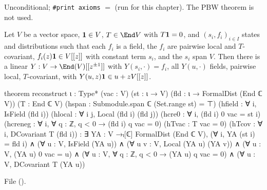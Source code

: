 \begin{status}
Unconditional; \texttt{\#print axioms}  $=$
\lean{[propext, Classical.}\allowbreak{}\allowbreak\lean{sound]} (run for this chapter). The PBW theorem  is not used.
\end{status}

\begin{theorem}\label{l03:thm:reconstruct}
Let $V$ be a vector space, $\mathbf{1}\in V$, $T\in\End V$ with $T\mathbf{1} = 0$, and $(s_i,f_i)_{i\in I}$
states and distributions such that each $f_i$ is a field, the $f_i$ are pairwise local and
$T$-covariant, $f_i(z)\mathbf{1}\in V[[z]]$ with constant term $s_i$, and the $s_i$ span $V$. Then there is
a linear $Y:V\to\End(V)[[z^{\pm1}]]$ with $Y(s_i,\cdot) = f_i$, all $Y(u,\cdot)$ fields, pairwise
local, $T$-covariant, with $Y(u,z)\mathbf{1}\in u+zV[[z]]$.
\end{theorem}
\begin{leancode}
theorem reconstruct {ι : Type*} (vac : V) (st : ι → V) (fld : ι → FormalDist (End ℂ V))
    (T : End ℂ V)
    (hspan : Submodule.span ℂ (Set.range st) = ⊤)
    (hfield : ∀ i, IsField (fld i))
    (hlocal : ∀ i j, Local (fld i) (fld j))
    (hcre0 : ∀ i, (fld i) 0 vac = st i)
    (hcreneg : ∀ i, ∀ q : ℤ, q < 0 → (fld i) q vac = 0)
    (hTvac : T vac = 0)
    (hTcov : ∀ i, DCovariant T (fld i)) :
    ∃ YA : V →ₗ[ℂ] FormalDist (End ℂ V),
      (∀ i, YA (st i) = fld i) ∧
      (∀ u : V, IsField (YA u)) ∧
      (∀ u v : V, Local (YA u) (YA v)) ∧
      (∀ u : V, (YA u) 0 vac = u) ∧
      (∀ u : V, ∀ q : ℤ, q < 0 → (YA u) q vac = 0) ∧
      (∀ u : V, DCovariant T (YA u))
\end{leancode}
File 
().

